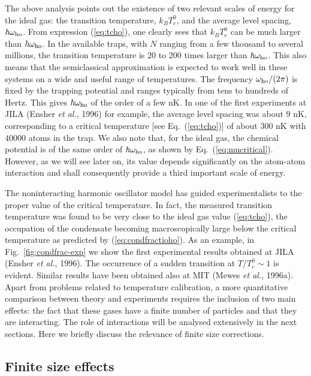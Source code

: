 The above analysis points out the existence of two relevant 
scales of energy for the ideal gas: the transition temperature,
$k_BT_c^0$, and the average level spacing, $\hbar \omega_{\rm ho}$. From
expression (\ref{eq:tcho}), one  clearly
sees that $k_BT_c^0$ can be much larger than $\hbar \omega_{\rm ho}$.
In the available traps, with $N$ ranging from a few
thousand to several millions, the transition temperature is
20 to 200 times larger than $\hbar \omega_{\rm ho}$. This also means
that the semiclassical approximation is expected to work well in these
systems on a wide and useful range of temperatures. The frequency
$\omega_{\rm ho}/(2\pi)$ is fixed by the trapping potential and 
ranges typically from tens to hundreds of Hertz. This  gives
$\hbar \omega_{\rm ho}$ of the order of a few nK.  In one of the
first experiments  at JILA (Ensher {\it et al.}, 1996) for
example, the  average level spacing  was about $9$ nK, corresponding 
to a critical temperature [see Eq.~(\ref{eq:tcho})] of about 
$300$ nK with $40000$ atoms in the trap. 
We also note that, for the ideal gas, the  chemical potential
is of the same  order of $\hbar \omega_{\rm ho}$, as shown by
Eq.~(\ref{eq:mucritical}). However, as we will see later on, its value
depends significantly on the atom-atom  interaction and shall
consequently provide a third important scale of energy.  

The noninteracting harmonic oscillator model has guided 
experimentalists to the proper value of the critical temperature. 
In fact, the measured transition temperature was found to be very close 
to the ideal gas value (\ref{eq:tcho}), the occupation  of the condensate 
becoming macroscopically large below the critical temperature as   
predicted by (\ref{eq:condfractioho}). As an example, in  
Fig.~\ref{fig:condfrac-exp} we show the first experimental results 
obtained at JILA (Ensher {\it et al.}, 1996). The occurrence of a 
sudden transition at $T/T_c^0 \sim 1$ is evident. Similar results have 
been obtained also at MIT (Mewes {\it et al.},  1996a).  Apart from 
problems  related to temperature calibration,  a more
quantitative comparison between theory and experiments requires
the inclusion of two main effects: the fact that these gases have a  
finite number of particles and that they are interacting.  The role 
of interactions will be analysed extensively in the next
sections. Here we briefly discuss the relevance of finite 
size corrections. 


\subsection{Finite size effects}
\label{sec:finitesize}

